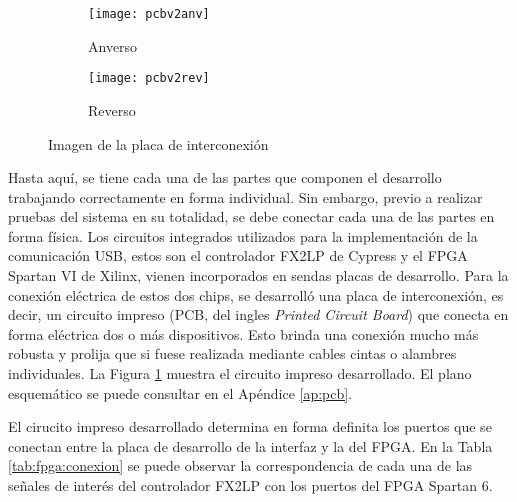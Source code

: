 \begin{figure}[ht]
	\centering
	\begin{subfigure}[t]{0.45\textwidth}
		\centering
		\texttt{[image: pcbv2anv]}
		\caption*{Anverso}
	\end{subfigure}
	\begin{subfigure}[t]{0.45\textwidth}
		\centering
		\texttt{[image: pcbv2rev]}
		\caption*{Reverso}
	\end{subfigure}
	\caption{Imagen de la placa de interconexión}
	\label{fpga:pcb:v2}
\end{figure}

Hasta aquí, se tiene cada una de las partes que componen el desarrollo trabajando correctamente en forma individual. Sin embargo, previo a realizar pruebas del sistema en su totalidad, se debe conectar cada una de las partes en forma física. Los circuitos integrados utilizados para la implementación de la comunicación USB, estos son el controlador FX2LP de Cypress y el FPGA Spartan VI de Xilinx, vienen incorporados en sendas placas de desarrollo. Para la conexión eléctrica de estos dos chips, se desarrolló una placa de interconexión, es decir, un circuito impreso (PCB, del ingles {\it Printed Circuit Board}) que conecta en forma eléctrica dos o más dispositivos. Esto brinda una conexión mucho más robusta y prolija que si fuese realizada mediante cables cintas o alambres individuales. La Figura \ref{fpga:pcb:v2} muestra el circuito impreso desarrollado. El plano esquemático se puede consultar en el Apéndice \ref{ap:pcb}.

El cirucito impreso desarrollado determina en forma definita los puertos que se conectan entre la placa de desarrollo de la interfaz y la del FPGA. En la Tabla \ref{tab:fpga:conexion} se puede observar la correspondencia de cada una de las señales de interés del controlador FX2LP con los puertos del FPGA Spartan 6.

